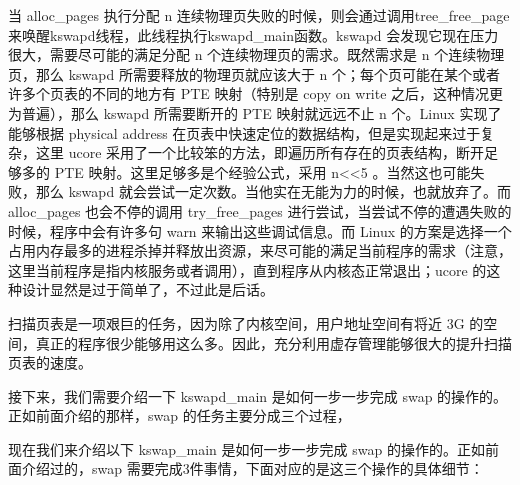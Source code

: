 当 alloc\_pages 执行分配 n
连续物理页失败的时候，则会通过调用tree\_free\_page来唤醒kswapd线程，此线程执行kswapd\_main函数。kswapd
会发现它现在压力很大，需要尽可能的满足分配 n
个连续物理页的需求。既然需求是 n 个连续物理页，那么 kswapd
所需要释放的物理页就应该大于 n
个；每个页可能在某个或者许多个页表的不同的地方有 PTE 映射（特别是 copy
on write 之后，这种情况更为普遍），那么 kswapd 所需要断开的 PTE
映射就远远不止 n 个。Linux 实现了能够根据 physical address
在页表中快速定位的数据结构，但是实现起来过于复杂，这里 ucore
采用了一个比较笨的方法，即遍历所有存在的页表结构，断开足够多的 PTE
映射。这里足够多是个经验公式，采用 n\textless{}\textless{}5
。当然这也可能失败，那么 kswapd
就会尝试一定次数。当他实在无能为力的时候，也就放弃了。而 alloc\_pages
也会不停的调用 try\_free\_pages
进行尝试，当尝试不停的遭遇失败的时候，程序中会有许多句 warn
来输出这些调试信息。而 Linux
的方案是选择一个占用内存最多的进程杀掉并释放出资源，来尽可能的满足当前程序的需求（注意，这里当前程序是指内核服务或者调用），直到程序从内核态正常退出；ucore
的这种设计显然是过于简单了，不过此是后话。

扫描页表是一项艰巨的任务，因为除了内核空间，用户地址空间有将近 3G
的空间，真正的程序很少能够用这么多。因此，充分利用虚存管理能够很大的提升扫描页表的速度。

接下来，我们需要介绍一下 kswapd\_main 是如何一步一步完成 swap
的操作的。正如前面介绍的那样，swap 的任务主要分成三个过程，

现在我们来介绍以下 kswap\_main 是如何一步一步完成 swap
的操作的。正如前面介绍过的，swap
需要完成3件事情，下面对应的是这三个操作的具体细节：

